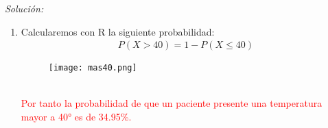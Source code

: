\documentclass[12pt]{article}
\newenvironment{sol}
    {\emph{Solución:}
    }
    {
    }
\begin{document}
\begin{sol}
\begin{enumerate}[label=\alph*)]
\begin{itemize}
  
    
    \end{itemize}
   
    
    
   \item Calcularemos con R la siguiente probabilidad:
   \begin{align*}
   P(X>40) = 1-P(X\leq40)
   \end{align*}
   \begin{figure}[h]  %
    \centering      %
    \texttt{[image: mas40.png]} 
\end{figure}
\\
 
\textcolor{red}{%
    Por tanto la probabilidad de que un paciente presente una temperatura mayor a 40° es de 34.95\%.
}
 
\end{enumerate}

\end{sol}





\end{document}
